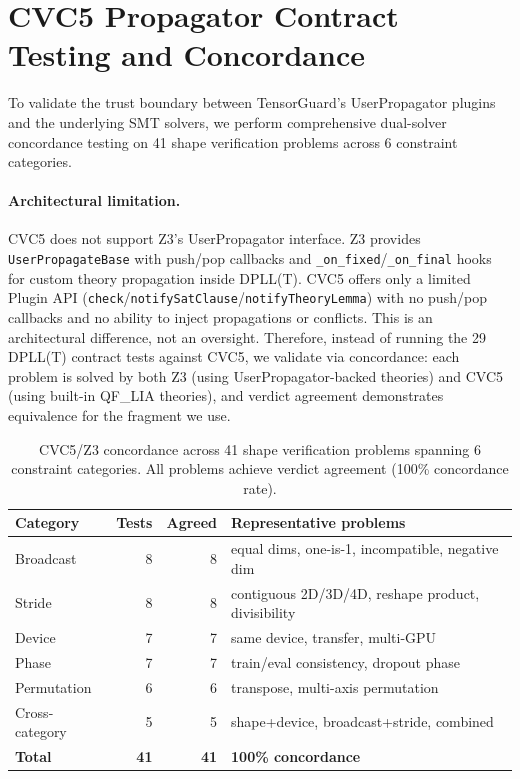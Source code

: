 \documentclass[11pt]{article}
\begin{document}
\section{CVC5 Propagator Contract Testing and Concordance}\label{app:cvc5-concordance}

To validate the trust boundary between TensorGuard's UserPropagator
plugins and the underlying SMT solvers, we perform comprehensive
dual-solver concordance testing on 41 shape verification problems
across 6 constraint categories.

\paragraph{Architectural limitation.}
CVC5 does not support Z3's UserPropagator interface.  Z3 provides
\texttt{UserPropagateBase} with push/pop callbacks and
\texttt{\_on\_fixed}/\texttt{\_on\_final} hooks for custom theory
propagation inside DPLL(T).  CVC5 offers only a limited Plugin API
(\texttt{check}/\texttt{notifySatClause}/\texttt{notifyTheoryLemma})
with no push/pop callbacks and no ability to inject propagations or
conflicts.  This is an architectural difference, not an oversight.
Therefore, instead of running the 29 DPLL(T) contract tests against
CVC5, we validate via concordance: each problem is solved by both Z3
(using UserPropagator-backed theories) and CVC5 (using built-in
QF\_LIA theories), and verdict agreement demonstrates equivalence
for the fragment we use.

\begin{table}[h]
\centering
\caption{CVC5/Z3 concordance across 41 shape verification problems
  spanning 6 constraint categories.  All problems achieve verdict
  agreement (100\% concordance rate).}
\label{tab:cvc5-concordance}
\small
\begin{tabular}{@{}lrrl@{}}
\toprule
\textbf{Category} & \textbf{Tests} & \textbf{Agreed} &
\textbf{Representative problems} \\
\midrule
Broadcast       & 8 & 8 & equal dims, one-is-1, incompatible, negative dim \\
Stride          & 8 & 8 & contiguous 2D/3D/4D, reshape product, divisibility \\
Device          & 7 & 7 & same device, transfer, multi-GPU \\
Phase           & 7 & 7 & train/eval consistency, dropout phase \\
Permutation     & 6 & 6 & transpose, multi-axis permutation \\
Cross-category  & 5 & 5 & shape+device, broadcast+stride, combined \\
\midrule
\textbf{Total}  & \textbf{41} & \textbf{41} & \textbf{100\% concordance} \\
\bottomrule
\end{tabular}
\end{table}
\end{document}
